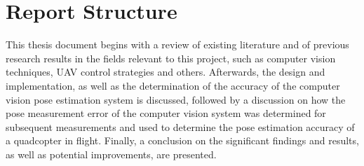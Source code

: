 \section{Report Structure}

This thesis document begins with a review of existing literature and of previous research results in the fields relevant to this project, such as computer vision techniques, UAV control strategies and others. Afterwards, the design and implementation, as well as the determination of the accuracy of the computer vision pose estimation system is discussed, followed by a discussion on how the pose measurement error of the computer vision system was determined for subsequent measurements and used to determine the pose estimation accuracy of a quadcopter in flight. Finally, a conclusion on the significant findings and results, as well as potential improvements, are presented. 
